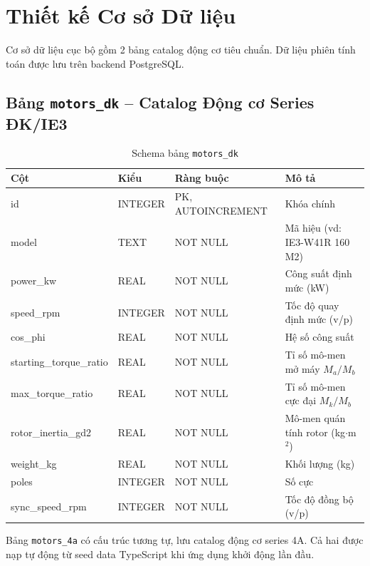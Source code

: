 \section{Thiết kế Cơ sở Dữ liệu}
\label{sec:design-db}

Cơ sở dữ liệu cục bộ gồm 2 bảng catalog động cơ tiêu chuẩn.
Dữ liệu phiên tính toán được lưu trên backend PostgreSQL.

\subsection{Bảng \texttt{motors\_dk} -- Catalog Động cơ Series ĐK/IE3}

\begin{table}[H]
  \centering
  \caption{Schema bảng \texttt{motors\_dk}}
  \label{tab:schema-motors-dk}
  \begin{tabular}{llll}
    \toprule
    \textbf{Cột} & \textbf{Kiểu} & \textbf{Ràng buộc} & \textbf{Mô tả} \\
    \midrule
    id                    & INTEGER & PK, AUTOINCREMENT & Khóa chính \\
    model                 & TEXT    & NOT NULL & Mã hiệu (vd: IE3-W41R 160 M2) \\
    power\_kw             & REAL    & NOT NULL & Công suất định mức (kW) \\
    speed\_rpm            & INTEGER & NOT NULL & Tốc độ quay định mức (v/p) \\
    cos\_phi              & REAL    & NOT NULL & Hệ số công suất \\
    starting\_torque\_ratio & REAL  & NOT NULL & Tỉ số mô-men mở máy $M_a/M_b$ \\
    max\_torque\_ratio    & REAL    & NOT NULL & Tỉ số mô-men cực đại $M_k/M_b$ \\
    rotor\_inertia\_gd2   & REAL    & NOT NULL & Mô-men quán tính rotor (kg$\cdot$m$^2$) \\
    weight\_kg            & REAL    & NOT NULL & Khối lượng (kg) \\
    poles                 & INTEGER & NOT NULL & Số cực \\
    sync\_speed\_rpm      & INTEGER & NOT NULL & Tốc độ đồng bộ (v/p) \\
    \bottomrule
  \end{tabular}
\end{table}

Bảng \texttt{motors\_4a} có cấu trúc tương tự, lưu catalog động cơ series 4A.
Cả hai được nạp tự động từ seed data TypeScript khi ứng dụng khởi động lần đầu.


